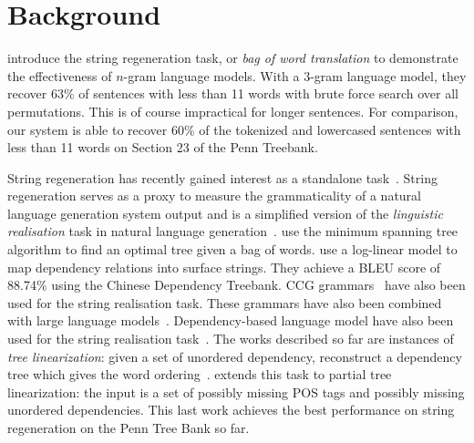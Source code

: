\section{Background}

\citet{brown-cocke-dellapietra-dellapietra-jelinek-lafferty-mercer-roossin:1990:CL}
introduce the string regeneration task, or \emph{bag of word translation}
to demonstrate the effectiveness
of $n$-gram language models. With a 3-gram language model, they recover
63\% of sentences with less than 11 words with brute force search
over all permutations. This is of course impractical for longer
sentences. For comparison, our system is able to recover
60\% of the tokenized and lowercased sentences with less than 11 words
on Section 23 of the Penn Treebank.

String regeneration has recently gained interest as
a standalone
task~\citep{wan-dras-dale-paris:2009:EACL,he-wang-guo-liu:2009:ACLIJCNLP,zhang-clark:2011:EMNLP,zhang-blackwood-clark:2012:EACL2012,zhang:2013:IJCAI}.
%
%
%
String regeneration serves as a proxy to measure the grammaticality of a
natural language generation system output and is a simplified version
of the \emph{linguistic realisation} task in natural language
generation~\citep{reiter-dale:1997:JNLE}.
\citet{wan-dras-dale-paris:2009:EACL} use the minimum spanning tree algorithm
to find an optimal tree given a bag of words.
\citet{he-wang-guo-liu:2009:ACLIJCNLP} use a log-linear model to map
dependency relations into surface strings. They achieve a BLEU
score of 88.74\% using the Chinese Dependency Treebank.
CCG grammars~\citep{zhang-clark:2011:EMNLP} have also been used
for the string realisation task. These grammars have also
been combined with large language
models~\citep{zhang-blackwood-clark:2012:EACL2012}.
Dependency-based language model have also been used for the
string realisation task~\citep{guo-wang-vanGenabith:2011:JNLE}.
The works described so far are instances of \emph{tree linearization}: given
a set of unordered dependency, reconstruct a dependency tree which gives
the word ordering~\citep{belz-bohnet-mille-wanner-white:2012:INLG}.
\citet{zhang:2013:IJCAI} extends this task to partial tree linearization: the
input is a set of possibly missing POS tags and possibly missing unordered
dependencies. This last work achieves the best performance on string regeneration
on the Penn Tree Bank so far.

